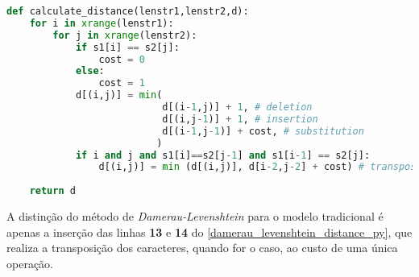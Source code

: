 \begin{lstlisting}[language=Python,label=damerau_levenshtein_distance_py,caption={Implementação da distância de Damerau-Levenshtein}]
def calculate_distance(lenstr1,lenstr2,d):
    for i in xrange(lenstr1):
        for j in xrange(lenstr2):
            if s1[i] == s2[j]:
                cost = 0
            else:
                cost = 1
            d[(i,j)] = min(
                           d[(i-1,j)] + 1, # deletion
                           d[(i,j-1)] + 1, # insertion
                           d[(i-1,j-1)] + cost, # substitution
                          )
            if i and j and s1[i]==s2[j-1] and s1[i-1] == s2[j]:
                d[(i,j)] = min (d[(i,j)], d[i-2,j-2] + cost) # transposition
 
    return d
\end{lstlisting}

A distinção do método de \textit{Damerau-Levenshtein} para o modelo tradicional é apenas a inserção das linhas \textbf{13} e \textbf{14} do \autoref{damerau_levenshtein_distance_py}, que realiza a transposição dos caracteres, quando for o caso, ao custo de uma única operação.

